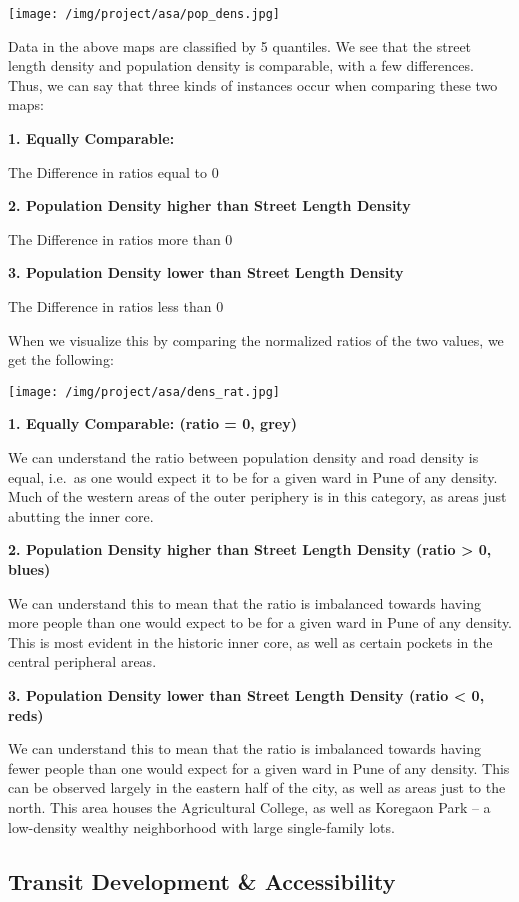 \documentclass[
]{article}
\begin{document}
\texttt{[image: /img/project/asa/pop\_dens.jpg]}

Data in the above maps are classified by 5 quantiles. We see that the
street length density and population density is comparable, with a few
differences. Thus, we can say that three kinds of instances occur when
comparing these two maps:

\textbf{1. Equally Comparable:}

The Difference in ratios equal to 0

\textbf{2. Population Density higher than Street Length Density}

The Difference in ratios more than 0

\textbf{3. Population Density lower than Street Length Density}

The Difference in ratios less than 0

When we visualize this by comparing the normalized ratios of the two
values, we get the following:

\texttt{[image: /img/project/asa/dens\_rat.jpg]}

\textbf{1. Equally Comparable: (ratio = 0, grey)}

We can understand the ratio between population density and road density
is equal, i.e.~as one would expect it to be for a given ward in Pune of
any density. Much of the western areas of the outer periphery is in this
category, as areas just abutting the inner core.

\textbf{2. Population Density higher than Street Length Density (ratio
\textgreater{} 0, blues)}

We can understand this to mean that the ratio is imbalanced towards
having more people than one would expect to be for a given ward in Pune
of any density. This is most evident in the historic inner core, as well
as certain pockets in the central peripheral areas.

\textbf{3. Population Density lower than Street Length Density (ratio
\textless{} 0, reds)}

We can understand this to mean that the ratio is imbalanced towards
having fewer people than one would expect for a given ward in Pune of
any density. This can be observed largely in the eastern half of the
city, as well as areas just to the north. This area houses the
Agricultural College, as well as Koregaon Park -- a low-density wealthy
neighborhood with large single-family lots.

\hypertarget{transit-development-accessibility}{%
\subsection{Transit Development \&
Accessibility}\label{transit-development-accessibility}}
\end{document}

